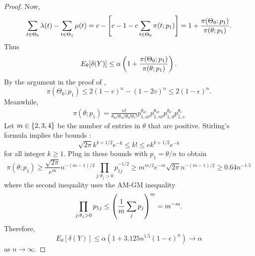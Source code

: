 \documentclass[12pt,reqno]{amsart}
\theoremstyle{theorem}
\theoremstyle{definition}
\newcommand{\0}{\mathbf{0}}
\newcommand{\1}{\mathbf{1}}
\begin{document}
\begin{proof}
    Now, \[
        \sum_{t \in \Theta_0} \lambda(t) - \sum_{t\in \Theta_1} \mu(t) = c - \left[{c - 1 - c
        \sum_{t\in \Theta_0} \pi(t; p_1) }\right] = 1 + \frac{\pi(\Theta_0; p_1)}{\pi(\theta; p_1)}.
    \]
    Thus \[
        E_\theta[\delta(Y)]  \le \alpha \left(1 + \frac{\pi(\Theta_0; p_1)}{\pi(\theta; p_1)}\right).
    \]
    By the argument in the proof of , \[
        \pi(\Theta_0; p_1) \le 2(1-v)^n - (1-2v)^n \le 2(1-\epsilon)^n.
    \]
    Meanwhile, \begin{align*}
    \pi(\theta; p_1) = \frac{n!}{\theta_{at}!\theta_{nt}!\theta_d!\theta_{c}!} p_{1,at}^
    {\theta_{at}} p_{1,nt}^{\theta_{nt}} p_{1,d}^{\theta_{d}} p_{1,c}^{\theta_{c}}
    \end{align*}
    Let $ m \in \left\{{2,3,4}\right\}$ be the number of entries in $\theta$ that are positive.
    Stirling's formula implies the bounds \citep{robbins1955remark}: \[
      \sqrt{2\pi} k^{k+1/2} e^{-k} \le k! \le e k^{k+1/2} e^{-k}
    \]
    for all integer $k \ge 1$. Plug in these bounds with $p_1 = \theta/n$ to obtain \[
          \pi(\theta; p_1) \ge \frac{\sqrt{2\pi}}{e^m} n^{-(m-1)/2} \prod_{j: \theta_j >
          0} p_{1j}^{-1/2} \ge m^{m/2} e^{-m} \sqrt{2\pi} n^{-(m-1)/2} \ge 0.64 n^{-1.5}
    \]
where the second inequality uses the AM-GM inequality\[
    \prod_{j: \theta_j >
          0} p_{1j} \le \left(\frac{1}{m} \sum_j p_j\right)^m = m^{-m}.
\]
Therefore, \[
    E_\theta [\delta(Y)] \le \alpha(1+3.125 n^{1.5}(1-\epsilon)^n) \to \alpha
\]
as $n \to \infty$.
\end{proof}


\bayescombined*
\end{document}
